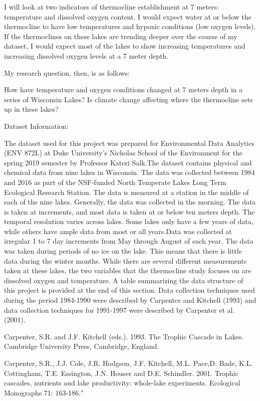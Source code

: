 \documentclass[12pt,]{article}
\begin{document}
I will look at two indicators of thermocline establishment at 7 meters:
temperature and dissolved oxygen content. I would expect water at or
below the thermocline to have low temperatures and hypoxic conditions
(low oxygen levels). If the thermoclines on these lakes are trending
deeper over the course of my dataset, I would expect most of the lakes
to show increasing temperatures and increasing dissolved oxygen levels
at a 7 meter depth.

My research question, then, is as follows:

How have temperature and oxygen conditions changed at 7 meters depth in
a series of Wisconsin Lakes? Is climate change affecting where the
thermocline sets up in these lakes?

Dataset Information:

The dataset used for this project was prepared for Environmental Data
Analytics (ENV 872L) at Duke University's Nicholas School of the
Environment for the spring 2019 semester by Professor Kateri Salk.The
dataset contains physical and chemical data from nine lakes in
Wisconsin. The data was collected between 1984 and 2016 as part of the
NSF-funded North Temperate Lakes Long Term Ecological Research Station.
The data is measured at a station in the middle of each of the nine
lakes. Generally, the data was collected in the morning. The data is
taken at increments, and most data is taken at or below ten meters
depth. The temporal resolution varies across lakes. Some lakes only have
a few years of data, while others have ample data from most or all
years.Data was collected at irregular 1 to 7 day increments from May
through August of each year. The data was taken during periods of no ice
on the lake. This means that there is little data during the winter
months. While there are several different measurements taken at these
lakes, the two variables that the thermocline study focuses on are
dissolved oxygen and temperature. A table summarizing the data structure
of this project is provided at the end of this section. Data collection
techniques used during the period 1984-1990 were described by Carpenter
and Kitchell (1993) and data collection techniques for 1991-1997 were
described by Carpenter et al. (2001).

Carpenter, S.R. and J.F. Kitchell (eds.). 1993. The Trophic Cascade in
Lakes. Cambridge University Press, Cambridge, England.

Carpenter, S.R., J.J. Cole, J.R. Hodgson, J.F. Kitchell, M.L. Pace,D.
Bade, K.L. Cottingham, T.E. Essington, J.N. Houser and D.E. Schindler.
2001. Trophic cascades, nutrients and lake productivity: whole-lake
experiments. Ecological Monographs 71: 163-186."
\end{document}
